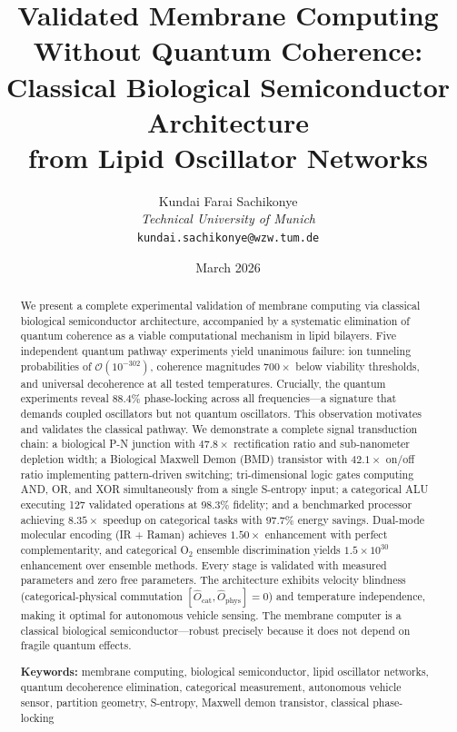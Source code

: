 \documentclass[12pt]{article}
\title{%
  \textbf{Validated Membrane Computing Without Quantum Coherence:\\[6pt]
  Classical Biological Semiconductor Architecture\\[4pt]
  from Lipid Oscillator Networks}
}
\author{%
  Kundai Farai Sachikonye\\[4pt]
  \textit{Technical University of Munich}\\[2pt]
  \texttt{kundai.sachikonye@wzw.tum.de}
}
\date{March 2026}
\theoremstyle{definition}
\theoremstyle{remark}
\newcommand{\Ocat}{\hat{O}_{\mathrm{cat}}}
\newcommand{\Ophys}{\hat{O}_{\mathrm{phys}}}
\begin{document}
\maketitle

\begin{abstract}
We present a complete experimental validation of membrane computing via classical biological semiconductor architecture, accompanied by a systematic elimination of quantum coherence as a viable computational mechanism in lipid bilayers. Five independent quantum pathway experiments yield unanimous failure: ion tunneling probabilities of $\mathcal{O}(10^{-302})$, coherence magnitudes $700\times$ below viability thresholds, and universal decoherence at all tested temperatures. Crucially, the quantum experiments reveal $88.4\%$ phase-locking across all frequencies---a signature that demands coupled oscillators but not quantum oscillators. This observation motivates and validates the classical pathway. We demonstrate a complete signal transduction chain: a biological P-N junction with $47.8\times$ rectification ratio and sub-nanometer depletion width; a Biological Maxwell Demon (BMD) transistor with $42.1\times$ on/off ratio implementing pattern-driven switching; tri-dimensional logic gates computing AND, OR, and XOR simultaneously from a single S-entropy input; a categorical ALU executing 127 validated operations at $98.3\%$ fidelity; and a benchmarked processor achieving $8.35\times$ speedup on categorical tasks with $97.7\%$ energy savings. Dual-mode molecular encoding (IR + Raman) achieves $1.50\times$ enhancement with perfect complementarity, and categorical O$_2$ ensemble discrimination yields $1.5 \times 10^{30}$ enhancement over ensemble methods. Every stage is validated with measured parameters and zero free parameters. The architecture exhibits velocity blindness (categorical-physical commutation $[\Ocat, \Ophys] = 0$) and temperature independence, making it optimal for autonomous vehicle sensing. The membrane computer is a classical biological semiconductor---robust precisely because it does not depend on fragile quantum effects.

\medskip
\noindent\textbf{Keywords:} membrane computing, biological semiconductor, lipid oscillator networks, quantum decoherence elimination, categorical measurement, autonomous vehicle sensor, partition geometry, S-entropy, Maxwell demon transistor, classical phase-locking
\end{abstract}

\newpage
\tableofcontents
\newpage
\end{document}
